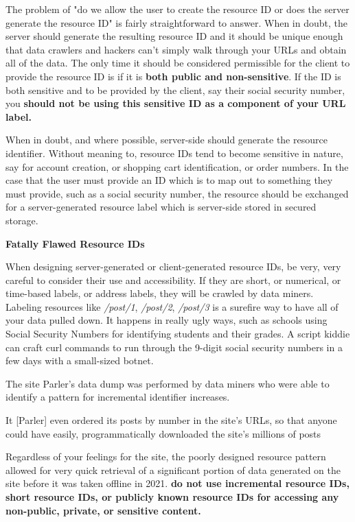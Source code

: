 The problem of "do we allow the user to create the resource ID or does the server generate the resource ID" is fairly straightforward to answer.  When in doubt, the server should generate the resulting resource ID and it should be unique enough that data crawlers and hackers can't simply walk through your URLs and obtain all of the data.  The only time it should be considered permissible for the client to provide the resource ID is if it is \textbf{both public and non-sensitive}.  If the ID is both sensitive and to be provided by the client, say their social security number, you \textbf{should not be using this sensitive ID as a component of your URL label.}

When in doubt, and where possible, server-side should generate the resource identifier.  Without meaning to, resource IDs tend to become sensitive in nature, say for account creation, or shopping cart identification, or order numbers.  In the case that the user must provide an ID which is to map out to something they must provide, such as a social security number, the resource should be exchanged for a server-generated resource label which is server-side stored in secured storage.

\begin{sidebar}
\begin{center}
\textbf{Fatally Flawed Resource IDs}
\end{center}
When designing server-generated or client-generated resource IDs, be very, very careful to consider their use and accessibility.  If they are short, or numerical, or time-based labels, or address labels, they will be crawled by data miners.  Labeling resources like \textit{/post/1}, \textit{/post/2}, \textit{/post/3} is a surefire way to have all of your data pulled down.  It happens in really ugly ways, such as schools using Social Security Numbers for identifying students and their grades.  A script kiddie can craft curl commands to run through the 9-digit social security numbers in a few days with a small-sized botnet.

The site Parler's data dump was performed by data miners who were able to identify a pattern for incremental identifier increases. \cite{Jennings}

\begin{displayquote}
It [Parler] even ordered its posts by number in the site's URLs, so that anyone could have easily, programmatically downloaded the site's millions of posts
\end{displayquote}

Regardless of your feelings for the site, the poorly designed resource pattern allowed for very quick retrieval of a significant portion of data generated on the site before it was taken offline in 2021.  \textbf{do not use incremental resource IDs, short resource IDs, or publicly known resource IDs for accessing any non-public, private, or sensitive content.}

\end{sidebar}

